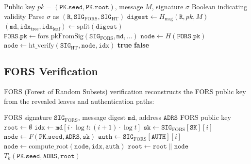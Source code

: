 \documentclass[11pt,a4paper]{article}
\begin{document}
\begin{algorithm}
\caption{SLH-DSA.Verify$(pk, M, \sigma)$}
\label{alg:verify}
\begin{algorithmic}[1]
\Require Public key $pk = (\texttt{PK.seed}, \texttt{PK.root})$, message $M$, signature $\sigma$
\Ensure Boolean indicating validity
\State Parse $\sigma$ as $(\texttt{R}, \texttt{SIG}_{\text{FORS}}, \texttt{SIG}_{\text{HT}})$
\State $\texttt{digest} \gets H_{\text{msg}}(\texttt{R}, pk, M)$ 
\State $(\texttt{md}, \texttt{idx}_{\text{tree}}, \texttt{idx}_{\text{leaf}}) \gets \text{split}(\texttt{digest})$
\State $\texttt{FORS.pk} \gets \text{fors\_pkFromSig}(\texttt{SIG}_{\text{FORS}}, \texttt{md}, ...)$ 
\State $\texttt{node} \gets H(\texttt{FORS.pk})$
\State $\texttt{node} \gets \text{ht\_verify}(\texttt{SIG}_{\text{HT}}, \texttt{node}, \texttt{idx})$ 
    \Return \textbf{true}
\Else
    \Return \textbf{false}
\EndIf
\end{algorithmic}
\end{algorithm}

\subsection{FORS Verification}

FORS (Forest of Random Subsets) verification reconstructs the FORS public key from the revealed leaves and authentication paths:

\begin{algorithm}
\caption{fors\_pkFromSig}
\label{alg:fors}
\begin{algorithmic}[1]
\Require FORS signature $\texttt{SIG}_{\text{FORS}}$, message digest $\texttt{md}$, address $\texttt{ADRS}$
\Ensure FORS public key
\State $\texttt{root} \gets \emptyset$
    \State $\texttt{idx} \gets \texttt{md}[i \cdot \log t : (i+1) \cdot \log t]$ 
    \State $\texttt{sk} \gets \texttt{SIG}_{\text{FORS}}[\texttt{SK}][i]$
    \State $\texttt{node} \gets F(\texttt{PK.seed}, \texttt{ADRS}, \texttt{sk})$ 
    \State $\texttt{auth} \gets \texttt{SIG}_{\text{FORS}}[\texttt{AUTH}][i]$
    \State $\texttt{node} \gets \text{compute\_root}(\texttt{node}, \texttt{idx}, \texttt{auth})$
    \State $\texttt{root} \gets \texttt{root} \| \texttt{node}$
\EndFor
\Return $T_k(\texttt{PK.seed}, \texttt{ADRS}, \texttt{root})$
\end{algorithmic}
\end{algorithm}
\end{document}
